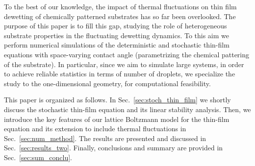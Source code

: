 To the best of our knowledge, the impact of thermal fluctuations on thin film dewetting of chemically patterned substrates has so far been overlooked.
The purpose of this paper is to fill this gap, studying the role of heterogeneous substrate properties in the fluctuating dewetting dynamics.
To this aim we perform numerical simulations of the deterministic and stochastic thin-film equations with space-varying contact angle (parametrizing the chemical pattering of the substrate). 
In particular, since we aim to simulate large systems, in order to achieve reliable statistics in terms of number of droplets, we specialize the study to the one-dimensional geometry, for computational feasibility.

This paper is organized as follows. In Sec.~\ref{sec:stoch_thin_film} we shortly discuss the stochastic thin-film equation and its linear stability analysis. 
Then, we introduce the key features of our lattice Boltzmann model for the thin-film equation and its extension to include thermal fluctuations in Sec.~\ref{sec:num_method}. 
The results are presented and discussed in Sec.~\ref{sec:results_two}. 
Finally, conclusions and summary are provided in Sec.~\ref{sec:sum_conclu}. 

